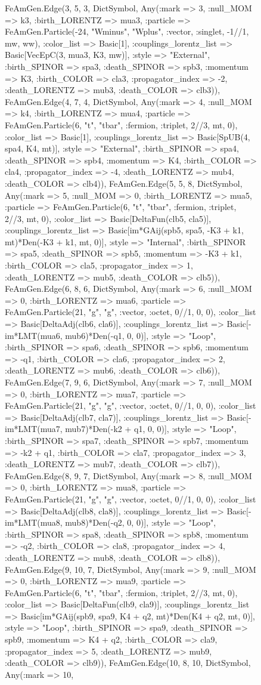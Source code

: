 \documentclass{revtex4}
\begin{document}
\begin{figure}[!htb]
\begin{center}
{FeAmGen.Edge(3, 5, 3, Dict{Symbol, Any}(:mark => 3, :null_MOM => k3, :birth_LORENTZ => mua3, :particle => FeAmGen.Particle(-24, "Wminus", "Wplus", :vector, :singlet, -1//1, mw, ww), :color_list => Basic[1], :couplings_lorentz_list => Basic[VecEpC(3, mua3, K3, mw)], :style => "External", :birth_SPINOR => spa3, :death_SPINOR => spb3, :momentum => K3, :birth_COLOR => cla3, :propagator_index => -2, :death_LORENTZ => mub3, :death_COLOR => clb3)), FeAmGen.Edge(4, 7, 4, Dict{Symbol, Any}(:mark => 4, :null_MOM => k4, :birth_LORENTZ => mua4, :particle => FeAmGen.Particle(6, "t", "tbar", :fermion, :triplet, 2//3, mt, 0), :color_list => Basic[1], :couplings_lorentz_list => Basic[SpUB(4, spa4, K4, mt)], :style => "External", :birth_SPINOR => spa4, :death_SPINOR => spb4, :momentum => K4, :birth_COLOR => cla4, :propagator_index => -4, :death_LORENTZ => mub4, :death_COLOR => clb4)), FeAmGen.Edge(5, 5, 8, Dict{Symbol, Any}(:mark => 5, :null_MOM => 0, :birth_LORENTZ => mua5, :particle => FeAmGen.Particle(6, "t", "tbar", :fermion, :triplet, 2//3, mt, 0), :color_list => Basic[DeltaFun(clb5, cla5)], :couplings_lorentz_list => Basic[im*GAij(spb5, spa5, -K3 + k1, mt)*Den(-K3 + k1, mt, 0)], :style => "Internal", :birth_SPINOR => spa5, :death_SPINOR => spb5, :momentum => -K3 + k1, :birth_COLOR => cla5, :propagator_index => 1, :death_LORENTZ => mub5, :death_COLOR => clb5)), FeAmGen.Edge(6, 8, 6, Dict{Symbol, Any}(:mark => 6, :null_MOM => 0, :birth_LORENTZ => mua6, :particle => FeAmGen.Particle(21, "g", "g", :vector, :octet, 0//1, 0, 0), :color_list => Basic[DeltaAdj(clb6, cla6)], :couplings_lorentz_list => Basic[-im*LMT(mua6, mub6)*Den(-q1, 0, 0)], :style => "Loop", :birth_SPINOR => spa6, :death_SPINOR => spb6, :momentum => -q1, :birth_COLOR => cla6, :propagator_index => 2, :death_LORENTZ => mub6, :death_COLOR => clb6)), FeAmGen.Edge(7, 9, 6, Dict{Symbol, Any}(:mark => 7, :null_MOM => 0, :birth_LORENTZ => mua7, :particle => FeAmGen.Particle(21, "g", "g", :vector, :octet, 0//1, 0, 0), :color_list => Basic[DeltaAdj(clb7, cla7)], :couplings_lorentz_list => Basic[-im*LMT(mua7, mub7)*Den(-k2 + q1, 0, 0)], :style => "Loop", :birth_SPINOR => spa7, :death_SPINOR => spb7, :momentum => -k2 + q1, :birth_COLOR => cla7, :propagator_index => 3, :death_LORENTZ => mub7, :death_COLOR => clb7)), FeAmGen.Edge(8, 9, 7, Dict{Symbol, Any}(:mark => 8, :null_MOM => 0, :birth_LORENTZ => mua8, :particle => FeAmGen.Particle(21, "g", "g", :vector, :octet, 0//1, 0, 0), :color_list => Basic[DeltaAdj(clb8, cla8)], :couplings_lorentz_list => Basic[-im*LMT(mua8, mub8)*Den(-q2, 0, 0)], :style => "Loop", :birth_SPINOR => spa8, :death_SPINOR => spb8, :momentum => -q2, :birth_COLOR => cla8, :propagator_index => 4, :death_LORENTZ => mub8, :death_COLOR => clb8)), FeAmGen.Edge(9, 10, 7, Dict{Symbol, Any}(:mark => 9, :null_MOM => 0, :birth_LORENTZ => mua9, :particle => FeAmGen.Particle(6, "t", "tbar", :fermion, :triplet, 2//3, mt, 0), :color_list => Basic[DeltaFun(clb9, cla9)], :couplings_lorentz_list => Basic[im*GAij(spb9, spa9, K4 + q2, mt)*Den(K4 + q2, mt, 0)], :style => "Loop", :birth_SPINOR => spa9, :death_SPINOR => spb9, :momentum => K4 + q2, :birth_COLOR => cla9, :propagator_index => 5, :death_LORENTZ => mub9, :death_COLOR => clb9)), FeAmGen.Edge(10, 8, 10, Dict{Symbol, Any}(:mark => 10, }
\end{center}
\end{figure}
\end{document}
